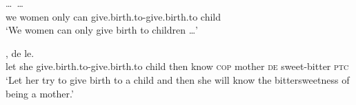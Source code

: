 
\ex\label{ex:sheng}%
\gll {}  \ldots\,    \ldots \\
we women {} only can give.birth.to-give.birth.to child\\
\glt `We women can only give birth to children \ldots'

\ex\label{ex:redup-achi-stat5}
\gll {}   ,     de  le.\\
let she give.birth.to-give.birth.to child then know \textsc{cop} mother \textsc{de} sweet-bitter \textsc{ptc}\\ 
\glt `Let her try to give birth to a child and then she will know the bittersweetness of being a mother.'
\z
\z



